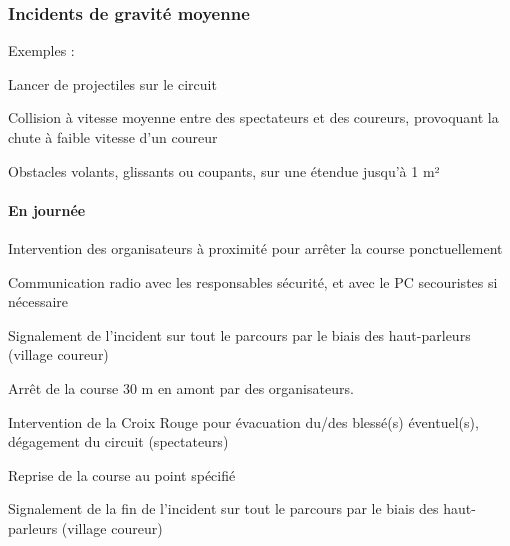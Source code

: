 \documentclass[hidelinks, paper=a4, fontsize=13pt]{report}
\begin{document}
\subsubsection{Incidents de gravité moyenne}

Exemples :
\begin{list}{•}{}
\item Lancer de projectiles sur le circuit
\item Collision à vitesse moyenne entre des spectateurs et des coureurs, provoquant la chute  à faible vitesse d’un coureur
\item Obstacles volants, glissants ou coupants, sur une étendue jusqu’à 1 m²

\end{list}

\paragraph{En journée}
\begin{list}{•}{}
\item Intervention des organisateurs à proximité pour arrêter la course ponctuellement 
\item Communication radio avec les responsables sécurité, et avec le PC secouristes si nécessaire
\item Signalement de l’incident sur tout le parcours par le biais des haut-parleurs (village coureur)
\item Arrêt de la course 30 m en amont par des organisateurs.
\item Intervention de la Croix Rouge pour évacuation du/des blessé(s) éventuel(s), dégagement du circuit (spectateurs)
\item Reprise de la course au point spécifié
\item Signalement de la fin de l’incident sur tout le parcours par le biais des haut-parleurs (village coureur)
\end{list}
\end{document}
